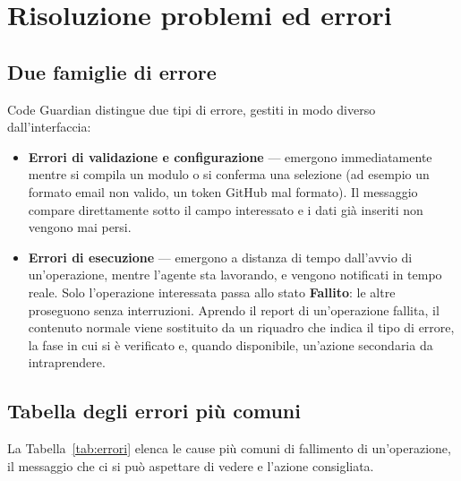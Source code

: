\documentclass[11pt,a4paper]{article}
\begin{document}
\newpage
\section{Risoluzione problemi ed errori}
\label{sec:errori}

\subsection{Due famiglie di errore}

Code Guardian distingue due tipi di errore, gestiti in modo diverso dall'interfaccia:

\begin{itemize}
  \item \textbf{Errori di validazione e configurazione} --- emergono immediatamente
        mentre si compila un modulo o si conferma una selezione (ad esempio un formato
        email non valido, un token GitHub mal formato). Il messaggio compare
        direttamente sotto il campo interessato e i dati già inseriti non vengono mai
        persi.
  \item \textbf{Errori di esecuzione} --- emergono a distanza di tempo dall'avvio di
        un'operazione, mentre l'agente sta lavorando, e vengono notificati in tempo reale.
        Solo l'operazione interessata passa allo stato \textbf{Fallito}: le altre
        proseguono senza interruzioni. Aprendo il report di un'operazione fallita, il
        contenuto normale viene sostituito da un riquadro che indica il tipo di errore,
        la fase in cui si è verificato e, quando disponibile, un'azione secondaria da
        intraprendere.
\end{itemize}

\subsection{Tabella degli errori più comuni}

La Tabella~\ref{tab:errori} elenca le cause più comuni di fallimento di un'operazione, il
messaggio che ci si può aspettare di vedere e l'azione consigliata.
\end{document}
